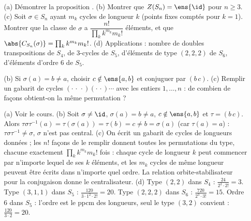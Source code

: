 \begin{exo}\label{exo-conj-sn}
(a) Démontrer la proposition . (b) Montrer que $Z(S_n)=\ens{\id}$ pour $n\ge3$. (c) Soit $\sigma\in S_n$ ayant $m_k$ cycles de longueur $k$ (points fixes comptés pour $k=1$). Montrer que la classe de $\sigma$ a $\dfrac{n!}{\prod_k k^{m_k}m_k!}$ éléments, et que $\abs{C_{S_n}(\sigma)}=\prod_kk^{m_k}m_k!$. (d) Applications : nombre de doubles transpositions de $S_4$, de 3-cycles de $S_5$, d'éléments de type $(2,2,2)$ de $S_6$, d'éléments d'ordre 6 de $S_5$.
\begin{indication}
(b) Si $\sigma(a)=b\neq a$, choisir $c\notin\ens{a,b}$ et conjuguer par $(b\,c)$. (c) Remplir un gabarit de cycles $(\cdot\,\cdot\,\cdot)(\cdot\,\cdot)\cdots$ avec les entiers $1,\dots,n$ : de combien de façons obtient-on la même permutation ?
\end{indication}
\begin{corrige}
(a) Voir le cours.
(b) Soit $\sigma\neq\id$, $\sigma(a)=b\neq a$, $c\notin\ens{a,b}$ et $\tau=(b\,c)$. Alors $\tau\sigma\tau^{-1}(a)=\tau(\sigma(a))=\tau(b)=c\neq b=\sigma(a)$ (car $\tau(a)=a$) : $\tau\sigma\tau^{-1}\neq\sigma$, $\sigma$ n'est pas central.
(c) On écrit un gabarit de cycles de longueurs données ; les $n!$ façons de le remplir donnent toutes les permutations du type, chacune exactement $\prod_kk^{m_k}m_k!$ fois : chaque cycle de longueur $k$ peut commencer par n'importe lequel de ses $k$ éléments, et les $m_k$ cycles de même longueur peuvent être écrits dans n'importe quel ordre. La relation orbite-stabilisateur pour la conjugaison donne le centralisateur.
(d) Type $(2,2)$ dans $S_4$ : $\frac{24}{2^2\cdot2!}=3$. Type $(3,1,1)$ dans $S_5$ : $\frac{120}{3\cdot1^2\cdot2!}=20$. Type $(2,2,2)$ dans $S_6$ : $\frac{720}{2^3\cdot3!}=15$. Ordre 6 dans $S_5$ : l'ordre est le ppcm des longueurs, seul le type $(3,2)$ convient : $\frac{120}{3\cdot2}=20$.
\end{corrige}
\end{exo}

